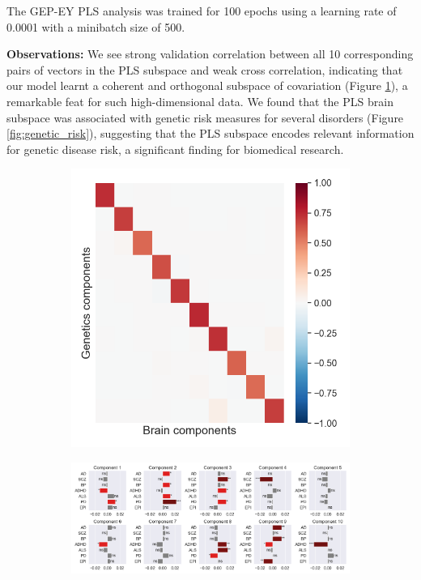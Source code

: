 The GEP-EY PLS analysis was trained for 100 epochs using a learning rate of 0.0001 with a minibatch size of 500.

\textbf{Observations:} We see strong validation correlation between all 10 corresponding pairs of vectors in the PLS subspace and weak cross correlation, indicating that our model learnt a coherent and orthogonal subspace of covariation (Figure \ref{fig:UKBB_corr}), a remarkable feat for such high-dimensional data. We found that the PLS brain subspace was associated with genetic risk measures for several disorders (Figure \ref{fig:genetic_risk}), suggesting that the PLS subspace encodes relevant information for genetic disease risk, a significant finding for biomedical research.

\begin{figure}
\centering
     \begin{subfigure}[b]{0.27\textwidth}
         \centering
          \includegraphics[width=\textwidth,trim={0.8cm 0cm 0.3cm 0cm}]{figures/UKBB/cross_corr.png}
          \caption{}
          \label{fig:UKBB_corr}
     \end{subfigure}
     \begin{subfigure}[b]{0.72\textwidth}
         \centering
          \includegraphics[width=\textwidth,trim={0.5cm 0cm 0.7cm 0cm}]{figures/UKBB/prs_correlations.png}

\end{subfigure}
\end{figure}

